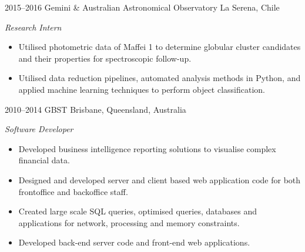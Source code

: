 \begin{entrylist}
\entry
{2015--2016}
{Gemini \& Australian Astronomical Observatory}
{La Serena, Chile}
{\emph{Research Intern}
\begin{itemize}
\item Utilised photometric data of Maffei 1 to determine globular cluster candidates and their properties for spectroscopic follow-up.
\item Utilised data reduction pipelines, automated analysis methods in Python, and applied machine learning techniques to perform
object classification.
\end{itemize}
}

\entry
{2010--2014}
{GBST}
{Brisbane, Queensland, Australia}
{\emph{Software Developer}
\begin{itemize}
\item Developed business intelligence reporting solutions to visualise complex financial data.
\item Designed and developed server and client based web application code for both frontoffice and backoffice staff.
\item Created large scale SQL queries, optimised queries, databases and applications for network, processing and memory constraints.
\item Developed back-end server code and front-end web applications.
\end{itemize}
}


\end{entrylist}





